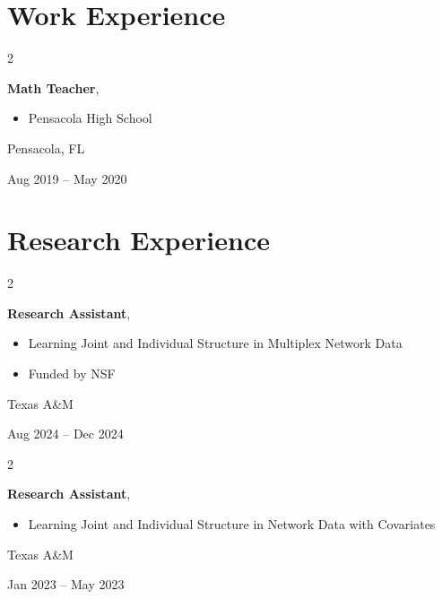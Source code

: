\documentclass[10pt, letterpaper]{article}
\newenvironment{highlights}{
	\begin{itemize}[
		topsep=0.10 cm,
		parsep=0.10 cm,
		partopsep=0pt,
		itemsep=0pt,
		leftmargin=0.4 cm + 10pt
		]
	}{
	\end{itemize}
} %
\newenvironment{twocolentry}[2][]{
	\onecolentry
	\def\secondColumn{#2}
	\setcolumnwidth{\fill, 4.5 cm}
	\begin{paracol}{2}
	}{
		\switchcolumn \raggedleft \secondColumn
	\end{paracol}
	\endonecolentry
} %
\begin{document}
\section{Work Experience}


\begin{twocolentry}{
		Pensacola, FL
		
		Aug 2019 – May 2020
	}
	\textbf{Math Teacher},
	\begin{highlights}
		\item Pensacola High School 
	\end{highlights}
\end{twocolentry}



















\section{Research Experience}


\begin{twocolentry}{
		Texas A\&M
		
		Aug 2024 – Dec 2024
	}
	\textbf{Research Assistant},
	\begin{highlights}
		\item Learning Joint and Individual Structure in Multiplex Network Data
		\item Funded by NSF 
	\end{highlights}
\end{twocolentry}


\begin{twocolentry}{
		Texas A\&M
		
		Jan 2023 – May 2023
	}
	\textbf{Research Assistant},
	\begin{highlights}
		\item Learning Joint and Individual Structure in Network Data with Covariates
	\end{highlights}
\end{twocolentry}
\end{document}
